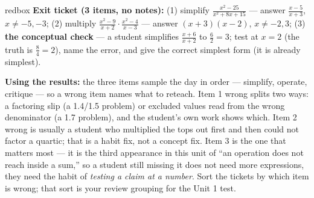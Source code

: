 \documentclass[10pt]{article}
\begin{document}
\begin{skillbox}{redbox}
\textbf{Exit ticket (3 items, no notes):} (1) simplify $\frac{x^2-25}{x^2+8x+15}$ --- answer
$\frac{x-5}{x+3}$, $x \ne -5, -3$; (2) multiply $\frac{x^2-9}{x+2} \cdot \frac{x^2-4}{x-3}$ ---
answer $(x+3)(x-2)$, $x \ne -2, 3$; (3) \textbf{the conceptual check} --- a student simplifies
$\frac{x+6}{x+2}$ to $\frac62=3$; test at $x=2$ (the truth is $\tfrac84=2$), name the error, and
give the correct simplest form (it is already simplest).

\textbf{Using the results:} the three items sample the day in order --- simplify, operate,
critique --- so a wrong item names what to reteach. Item 1 wrong splits two ways: a factoring slip
(a 1.4/1.5 problem) or excluded values read from the wrong denominator (a 1.7 problem), and the
student's own work shows which. Item 2 wrong is usually a student who multiplied the tops out
first and then could not factor a quartic; that is a habit fix, not a concept fix. Item 3 is the
one that matters most --- it is the third appearance in this unit of ``an operation does not reach
inside a sum,'' so a student still missing it does not need more expressions, they need the habit
of \emph{testing a claim at a number}. Sort the tickets by which item is wrong; that sort is your
review grouping for the Unit 1 test.
\end{skillbox}
\end{document}
